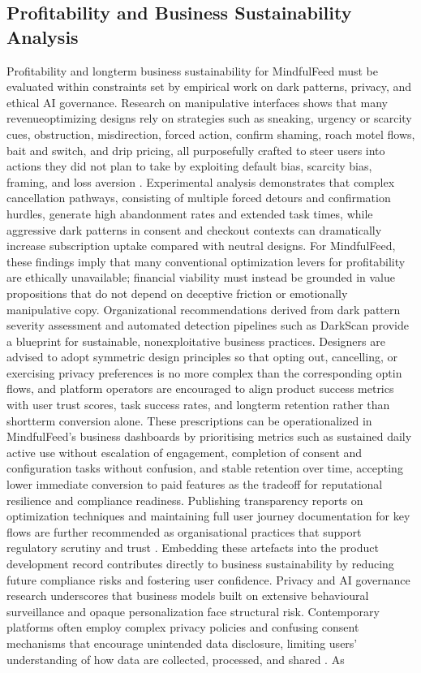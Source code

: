 \documentclass{article}
\begin{document}
\subsection{Profitability and Business Sustainability Analysis}
\label{sec:profitability_sustainability_analysis} Profitability and long\-term business sustainability for MindfulFeed must be evaluated within constraints set by empirical work on dark patterns, privacy, and ethical AI governance. Research on manipulative interfaces shows that many revenue\-optimizing designs rely on strategies such as sneaking, urgency or scarcity cues, obstruction, misdirection, forced action, confirm shaming, roach motel flows, bait and switch, and drip pricing, all purposefully crafted to steer users into actions they did not plan to take by exploiting default bias, scarcity bias, framing, and loss aversion \parencites[2]{5127387}. Experimental analysis demonstrates that complex cancellation pathways, consisting of multiple forced detours and confirmation hurdles, generate high abandonment rates and extended task times, while aggressive dark patterns in consent and checkout contexts can dramatically increase subscription uptake compared with neutral designs. For MindfulFeed, these findings imply that many conventional optimization levers for profitability are ethically unavailable; financial viability must instead be grounded in value propositions that do not depend on deceptive friction or emotionally manipulative copy. Organizational recommendations derived from dark pattern severity assessment and automated detection pipelines such as DarkScan provide a blueprint for sustainable, non\-exploitative business practices. Designers are advised to adopt symmetric design principles so that opting out, cancelling, or exercising privacy preferences is no more complex than the corresponding opt\-in flows, and platform operators are encouraged to align product success metrics with user trust scores, task success rates, and long\-term retention rather than short\-term conversion alone. These prescriptions can be operationalized in MindfulFeed's business dashboards by prioritising metrics such as sustained daily active use without escalation of engagement, completion of consent and configuration tasks without confusion, and stable retention over time, accepting lower immediate conversion to paid features as the trade\-off for reputational resilience and compliance readiness. Publishing transparency reports on optimization techniques and maintaining full user journey documentation for key flows are further recommended as organisational practices that support regulatory scrutiny and trust \parencites[8]{4807303}. Embedding these artefacts into the product development record contributes directly to business sustainability by reducing future compliance risks and fostering user confidence. Privacy and AI governance research underscores that business models built on extensive behavioural surveillance and opaque personalization face structural risk. Contemporary platforms often employ complex privacy policies and confusing consent mechanisms that encourage unintended data disclosure, limiting users' understanding of how data are collected, processed, and shared \parencites[3]{2668071}. As 
\end{document}
